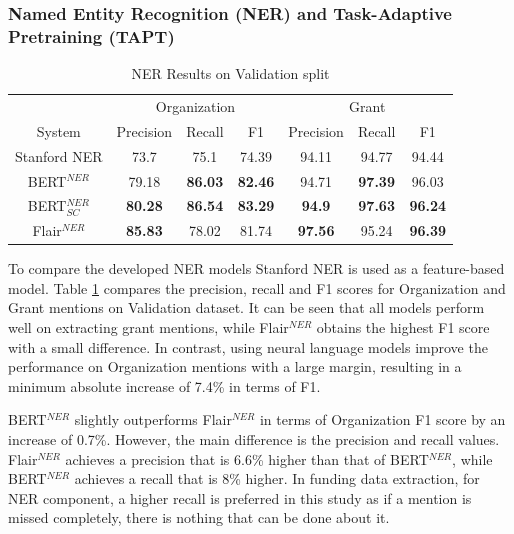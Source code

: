 \documentclass{report}
\theoremstyle{definition}
\theoremstyle{remark}
\begin{document}
\subsubsection{Named Entity Recognition (NER) and Task-Adaptive Pretraining (TAPT)}


\begin{table}
    \centering
    \begin{tabular}{c| c c c| c c c}
    &\multicolumn{3}{c|}{Organization}&\multicolumn{3}{c}{Grant} \\
    System&Precision&Recall&F1&Precision&Recall&F1\\
    \hline
    Stanford NER & 73.7&	75.1&74.39&94.11&94.77&94.44
 \\[0.7ex]
    BERT$^{NER}$ & 79.18&\textbf{86.03}&\textbf{82.46}&94.71&\textbf{97.39}&96.03
\\[0.7ex]
    BERT$^{NER}_{SC}$ & \textbf{80.28}&\textcolor{ao}{\textbf{86.54}}&\textcolor{ao}{\textbf{83.29}}&\textbf{94.9}	&\textcolor{ao}{\textbf{97.63}}&\textbf{96.24}
  \\[0.7ex]
    Flair$^{NER}$& \textcolor{ao}{\textbf{85.83}}&78.02&81.74&\textcolor{ao}{\textbf{97.56}}&95.24&\textcolor{ao}{\textbf{96.39}}
 \\[0.7ex]
    \end{tabular}
    \caption{NER Results on Validation split}
    \label{tab:all_ner_results}
\end{table}

To compare the developed NER models Stanford NER \cite{stanfordNER} is used as a feature-based model. Table \ref{tab:all_ner_results} compares the precision, recall and F1 scores for Organization and Grant mentions on Validation dataset. It can be seen that all models perform well on extracting grant mentions, while Flair$^{NER}$ obtains the highest F1 score with a small difference. In contrast, using neural language models improve the performance on Organization mentions with a large margin, resulting in a minimum absolute increase of 7.4\% in terms of F1.

BERT$^{NER}$ slightly outperforms Flair$^{NER}$ in terms of Organization F1 score by an increase of 0.7\%. However, the main difference is the precision and recall values. Flair$^{NER}$ achieves a precision that is 6.6\% higher than that of BERT$^{NER}$, while BERT$^{NER}$ achieves a recall that is 8\% higher. In funding data extraction, for NER component, a higher recall is preferred in this study as if a mention is missed completely, there is nothing that can be done about it.
\end{document}

